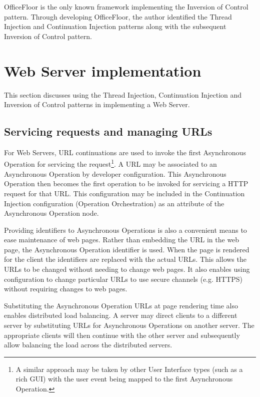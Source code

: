 \documentclass[prodmode]{style/acmlarge}
\begin{document}
OfficeFloor is the only known framework implementing the Inversion of Control
pattern.  Through developing OfficeFloor, the author identified the Thread
Injection and Continuation Injection patterns along with the subsequent
Inversion of Control pattern.



\section{Web Server implementation}

This section discusses using the Thread Injection, Continuation Injection and
Inversion of Control patterns in implementing a Web Server.


\subsection{Servicing requests and managing URLs}

For Web Servers, URL continuations \cite{url-continuation} are used to invoke
the first Asynchronous Operation for servicing the request\footnote{A similar
approach may be taken by other User Interface types (such as a rich GUI) with
the user event being mapped to the first Asynchronous Operation.}.  A URL may be
associated to an Asynchronous Operation by developer configuration.  This
Asynchronous Operation then becomes the first operation to be invoked for
servicing a HTTP request for that URL.  This configuration may be included in
the Continuation Injection configuration (Operation Orchestration) as an
attribute of the Asynchronous Operation node.

Providing identifiers to Asynchronous Operations is also a convenient means to
ease maintenance of web pages.  Rather than embedding the URL in the web page,
the Asynchronous Operation identifier is used.  When the page is rendered for
the client the identifiers are replaced with the actual URLs.  This allows the
URLs to be changed without needing to change web pages.  It also enables using
configuration to change particular URLs to use secure channels (e.g. HTTPS)
without requiring changes to web pages.

Substituting the Asynchronous Operation URLs at page rendering time also enables
distributed load balancing.  A server may direct clients to a different server
by substituting URLs for Asynchronous Operations on another server. The
appropriate clients will then continue with the other server and subsequently
allow balancing the load across the distributed servers.
\end{document}
